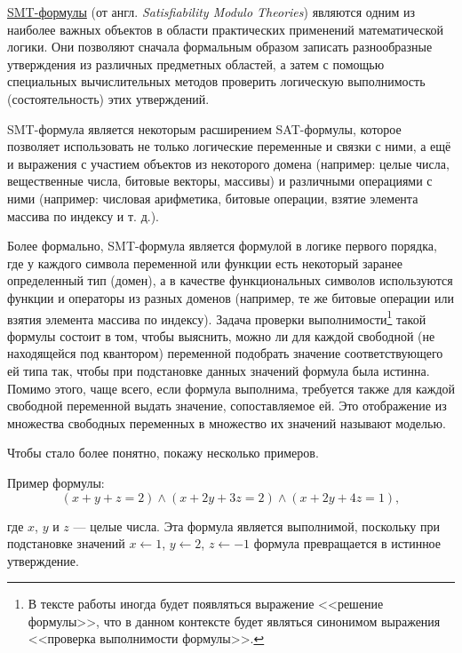 


\underline{SMT-формулы} (от англ. \textit{Satisfiability Modulo Theories}) являются одним из наиболее важных объектов в области практических применений математической логики. Они позволяют сначала формальным образом записать разнообразные утверждения из различных предметных областей, а затем с помощью специальных вычислительных методов проверить логическую выполнимость (состоятельность) этих утверждений.

SMT-формула является некоторым расширением SAT-формулы, которое позволяет использовать не только логические переменные и связки с ними, а ещё и выражения с участием объектов из некоторого домена (например: целые числа, вещественные числа, битовые векторы, массивы) и различными операциями с ними (например: числовая арифметика, битовые операции, взятие элемента массива по индексу и т. д.).

Более формально, SMT-формула является формулой в логике первого порядка, где у каждого символа переменной или функции есть некоторый заранее определенный тип (домен), а в качестве функциональных символов используются функции и операторы из разных доменов (например, те же битовые операции или взятия элемента массива по индексу). Задача проверки выполнимости\footnote{В тексте работы иногда будет появляться выражение <<решение формулы>>, что в данном контексте будет являться синонимом выражения <<проверка выполнимости формулы>>.} такой формулы состоит в том, чтобы выяснить, можно ли для каждой свободной (не находящейся под квантором) переменной подобрать значение соответствующего ей типа так, чтобы при подстановке данных значений формула была истинна. Помимо этого, чаще всего, если формула выполнима, требуется также для каждой свободной переменной выдать значение, сопоставляемое ей. Это отображение из множества свободных переменных в множество их значений называют моделью.

Чтобы стало более понятно, покажу несколько примеров.

Пример формулы:
\begin{equation} \label{smt-example-1}
    (x + y + z = 2) \wedge (x + 2y + 3z = 2) \wedge (x + 2y + 4z = 1),
\end{equation}

где $x$, $y$ и $z$ --- целые числа. Эта формула является выполнимой, поскольку при подстановке значений $x \leftarrow 1$, $y \leftarrow 2$, $z \leftarrow -1$ формула превращается в истинное утверждение.

